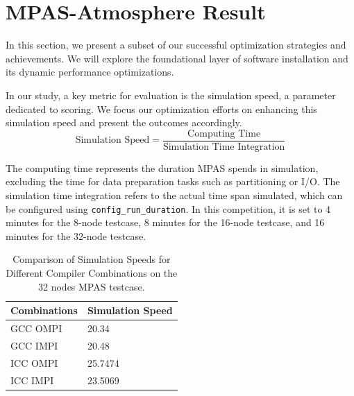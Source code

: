 \pgfplotsset{compat=1.17}

\section{MPAS-Atmosphere Result}
In this section, we present a subset of our successful optimization strategies and achievements. We will explore the foundational layer of software installation and its dynamic performance optimizations.

In our study, a key metric for evaluation is the simulation speed, a parameter dedicated to scoring. We focus our optimization efforts on enhancing this simulation speed and present the outcomes accordingly. \\

\[\text{Simulation Speed} = \frac{\text{Computing Time}}{\text{Simulation Time Integration}}\]

The computing time represents the duration MPAS spends in simulation, excluding the time for data preparation tasks such as partitioning or I/O. The simulation time integration refers to the actual time span simulated, which can be configured using \texttt{config\_run\_duration}. In this competition, it is set to 4 minutes for the 8-node testcase, 8 minutes for the 16-node testcase, and 16 minutes for the 32-node testcase.

\label{sec:MPAS}

\begin{table}[t]
  \centering
  \caption{Comparison of Simulation Speeds for Different Compiler Combinations on the 32 nodes MPAS testcase.}
    \begin{tabular}{ll}
        \toprule
        Combinations & Simulation Speed  \\
        \midrule
        GCC OMPI & 20.34 \\
        GCC IMPI & 20.48 \\
        ICC OMPI & 25.7474 \\
        ICC IMPI & 23.5069 \\
        \bottomrule
    \end{tabular}
    \label{tab:mpas-compiler-combo}
\end{table}

